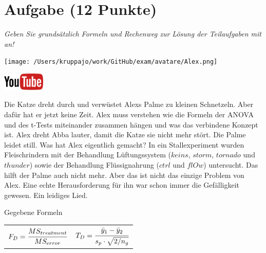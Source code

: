 \documentclass[a4paper, 9pt]{scrartcl}\usepackage[]{graphicx}\usepackage[]{xcolor}
\begin{document}
\clearpage

\section{Aufgabe \hfill (12 Punkte)}

\textit{Geben Sie grundsätzlich Formeln und Rechenweg zur Lösung der Teilaufgaben mit an!} \\[1Ex]
 

 
\begin{minipage}[t]{0.5\textwidth}
\texttt{[image: /Users/kruppajo/work/GitHub/exam/avatare/Alex.png]}
\end{minipage}
\begin{minipage}[t]{0.5\textwidth}
\hfill
\href{https://youtu.be/FjjJXkFJfIY}{\includegraphics[width = 2cm]{img/youtube}}\\[1Ex]
\end{minipage}
\vspace{1ex}



Die Katze dreht durch und verwüstet Alexs Palme zu kleinen Schnetzeln. Aber dafür hat er jetzt keine Zeit. Alex muss verstehen wie die Formeln der ANOVA und des t-Tests miteinander zusammen hängen und was das verbindene Konzept ist. Alex dreht Abba lauter, damit die Katze sie nicht mehr stört. Die Palme leidet still. Was hat Alex eigentlich gemacht? In ein Stallexperiment wurden Fleischrindern mit der Behandlung Lüftungssystem ($keins$, $storm$, $tornado$ und $thunder$) sowie der Behandlung Flüssignahrung ($ctrl$ und $flOw$) untersucht. Das hilft der Palme auch nicht mehr. Aber das ist nicht das einzige Problem von Alex. Eine echte Herausforderung für ihn war schon immer die Gefälligkeit gewesen. Ein leidiges Lied.

\begin{graybox}{Gegebene Formeln}
\begin{center}
  \begin{tabular}{cc}
    $F_{D} = \cfrac{MS_{treatment}}{MS_{error}}$ & $T_{D} = \cfrac{\bar{y}_1 - \bar{y}_2}{s_p \cdot \sqrt{2/n_g}}$\\
  \end{tabular}
\end{center}
\end{graybox}
\end{document}
